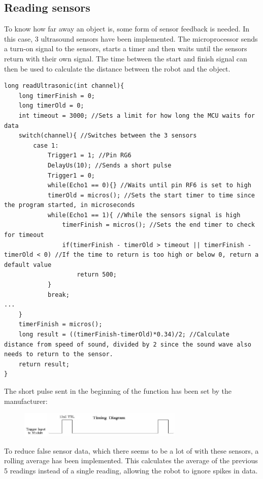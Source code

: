 \subsection{Reading sensors}
To know how far away an object is, some form of sensor feedback is needed. In this case, 3 ultrasound sensors have been implemented. The microprocessor sends a turn-on signal to the sensors, starts a timer and then waits until the sensors return with their own signal. The time between the start and finish signal can then be used to calculate the distance between the robot and the object.\\
\begin{lstlisting}
long readUltrasonic(int channel){  
    long timerFinish = 0;
    long timerOld = 0;
    int timeout = 3000; //Sets a limit for how long the MCU waits for data
    switch(channel){ //Switches between the 3 sensors
        case 1:
            Trigger1 = 1; //Pin RG6
            DelayUs(10); //Sends a short pulse
            Trigger1 = 0;
            while(Echo1 == 0){} //Waits until pin RF6 is set to high
            timerOld = micros(); //Sets the start timer to time since the program started, in microseconds
            while(Echo1 == 1){ //While the sensors signal is high
                timerFinish = micros(); //Sets the end timer to check for timeout
                if(timerFinish - timerOld > timeout || timerFinish - timerOld < 0) //If the time to return is too high or below 0, return a default value
                    return 500;
            }
            break;
...
    }
    timerFinish = micros();
    long result = ((timerFinish-timerOld)*0.34)/2; //Calculate distance from speed of sound, divided by 2 since the sound wave also needs to return to the sensor.
    return result;  
}
\end{lstlisting}
The short pulse sent in the beginning of the function has been set by the manufacturer: 
\begin{figure}[!ht]
	\centering
	\includegraphics[width=0.7\textwidth]{figures/sensorTiming.PNG}
	\caption{}
	\label{Timing diagram}
\end{figure}

To reduce false sensor data, which there seems to be a lot of with these sensors, a rolling average has been implemented. This calculates the average of the previous 5 readings instead of a single reading, allowing the robot to ignore spikes in data.
\newpage
